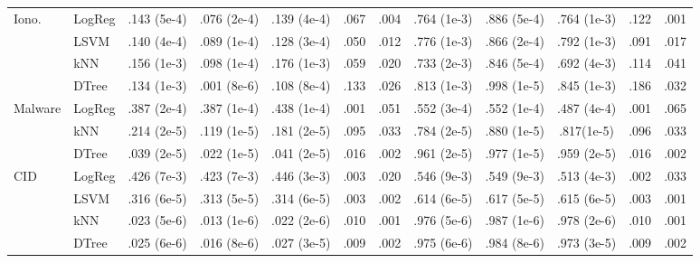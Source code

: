 \documentclass[10pt,a4paper,conference]{IEEEtran}
\begin{document}
\begin{table*}[t!]
\begin{threeparttable}
\begin{tabular}{llccccc|ccccc}
Iono. & LogReg & .143 (5e-4) & .076 (2e-4) & .139 (4e-4) & .067 & .004  
& .764 (1e-3) & .886 (5e-4) & .764 (1e-3) & .122 & .001 \\ 
\ & LSVM & .140 (4e-4) & .089 (1e-4) & .128 (3e-4) & .050 & .012 
& .776 (1e-3) & .866 (2e-4) & .792 (1e-3) & .091 & .017 \\ 
\ & kNN & .156 (1e-3) & .098 (1e-4) & .176 (1e-3) & .059 & .020 
& .733 (2e-3) & .846 (5e-4) & .692 (4e-3) & .114 & .041 \\ 
\ & DTree & .134 (1e-3) & .001 (8e-6) & .108 (8e-4) & .133 & .026  
& .813 (1e-3) & .998 (1e-5) & .845 (1e-3) & .186 & .032 \\ \hline 
Malware & LogReg & .387 (2e-4) & .387 (1e-4) & .438 (1e-4)& .001 & .051  
& .552 (3e-4) & .552 (1e-4) & .487 (4e-4) & .001 &  .065  \\
\ & kNN & .214 (2e-5) & .119 (1e-5) & .181 (2e-5) & .095 & .033  
& .784 (2e-5) & .880 (1e-5) & .817(1e-5) & .096 & .033 \\  
\ & DTree & .039 (2e-5) & .022 (1e-5) & .041 (2e-5) & .016 & .002  
& .961 (2e-5) & .977 (1e-5) & .959 (2e-5) & .016 & .002 \\ \hline 
CID 
& LogReg & .426 (7e-3) & .423 (7e-3) & .446 (3e-3)& .003 & .020  
& .546 (9e-3) & .549 (9e-3) & .513 (4e-3) & .002 &  .033  \\
\ & LSVM & .316 (6e-5) & .313 (5e-5) & .314 (6e-5) & .003 & .002  
& .614 (6e-5) & .617 (5e-5) & .615 (6e-5) & .003 & .001 \\
\ & kNN & .023 (5e-6) & .013 (1e-6) & .022 (2e-6) & .010 & .001  
& .976 (5e-6) & .987 (1e-6) & .978 (2e-6) & .010 & .001 \\ 
\ & DTree & .025 (6e-6) & .016 (8e-6) & .027 (3e-5) & .009 & .002  
& .975 (6e-6) & .984 (8e-6) & .973 (3e-5) & .009 & .002 \\ \hline 
\end{tabular}
\end{threeparttable}
\label{tab1:accf1}
\end{table*}
\end{document}
